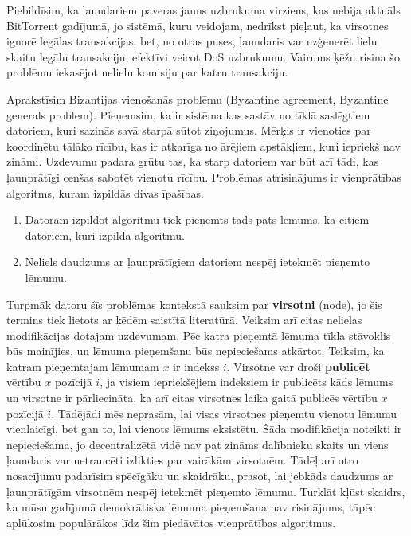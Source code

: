 Piebildīsim, ka ļaundariem paveras jauns uzbrukuma virziens, kas nebija aktuāls BitTorrent gadījumā, jo sistēmā, kuru veidojam, nedrīkst pieļaut, ka virsotnes ignorē legālas transakcijas, bet, no otras puses, ļaundaris var uzģenerēt lielu skaitu legālu transakciju, efektīvi veicot DoS uzbrukumu. Vairums ķēžu risina šo problēmu iekasējot nelielu komisiju par katru transakciju.

Aprakstīsim Bizantijas vienošanās problēmu (Byzantine agreement, Byzantine generals problem).
Pieņemsim, ka ir sistēma kas sastāv no tīklā saslēgtiem datoriem, kuri sazinās savā starpā sūtot ziņojumus. Mērķis ir vienoties par koordinētu tālāko rīcību, kas ir atkarīga no ārējiem apstākļiem, kuri iepriekš nav zināmi. Uzdevumu padara grūtu tas, ka starp datoriem var būt arī tādi, kas ļaunprātīgi cenšas sabotēt vienotu rīcību.
Problēmas atrisinājums ir vienprātības algoritms, kuram izpildās divas īpašības.
\begin{enumerate}
    \item Datoram izpildot algoritmu tiek pieņemts tāds pats lēmums, kā citiem datoriem, kuri izpilda algoritmu.
    \item Neliels daudzums ar ļaunprātīgiem datoriem nespēj ietekmēt pieņemto lēmumu.
\end{enumerate}\cite{lamport82}
Turpmāk datoru šīs problēmas kontekstā sauksim par \textbf{virsotni} (node), jo šis termins tiek lietots ar ķēdēm saistītā literatūrā. Veiksim arī citas nelielas modifikācijas dotajam uzdevumam.
Pēc katra pieņemtā lēmuma tīkla stāvoklis būs mainījies, un lēmuma pieņemšanu būs nepieciešams atkārtot. Teiksim, ka katram pieņemtajam lēmumam $x$ ir indekss $i$. Virsotne var droši \textbf{publicēt} vērtību $x$ pozīcijā $i$, ja visiem iepriekšējiem indeksiem ir publicēts kāds lēmums un virsotne ir pārliecināta, ka arī citas virsotnes laika gaitā publicēs vērtību $x$ pozīcijā $i$.\cite{mazieres15} Tādējādi mēs neprasām, lai visas virsotnes pieņemtu vienotu lēmumu vienlaicīgi, bet gan to, lai vienots lēmums eksistētu. Šāda modifikācija noteikti ir nepieciešama, jo decentralizētā vidē nav pat zināms dalībnieku skaits un viens ļaundaris var netraucēti izlikties par vairākām virsotnēm.
Tādēļ arī otro nosacījumu padarīsim spēcīgāku un skaidrāku, prasot, lai jebkāds daudzums ar ļaunprātīgām virsotnēm nespēj ietekmēt pieņemto lēmumu.
Turklāt kļūst skaidrs, ka mūsu gadījumā demokrātiska lēmuma pieņemšana nav risinājums, tāpēc aplūkosim populārākos līdz šim piedāvātos vienprātības algoritmus.

